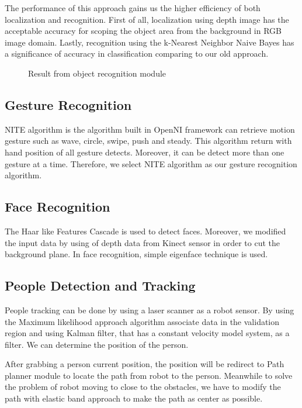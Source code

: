 \documentclass{llncs}
\begin{document}
The performance of this approach gains us the higher efficiency of both localization and recognition. First of all, localization using depth image has the acceptable accuracy for scoping the object area from the background in RGB image domain. Lastly, recognition using the  k-Nearest Neighbor Naive Bayes has a significance of accuracy in classification comparing to our old approach. 

\begin{figure}
\centering
\caption{Result from object recognition module}
\label{fig:object_recog}
\end{figure}

\subsection{Gesture Recognition}

NITE algorithm is the algorithm built in OpenNI framework can retrieve motion gesture such as wave, circle, swipe, push and steady. This algorithm return with hand position of all gesture detects.
Moreover, it can be detect more than one gesture at a time. Therefore, we select NITE algorithm as our
gesture recognition algorithm.

\subsection{Face Recognition}

The Haar like Features Cascade is used to detect faces. Moreover, we modified the input data by using of depth data from Kinect sensor in order to cut the background plane. In face recognition, simple eigenface technique is used.

\subsection{People Detection and Tracking}

People tracking can be done by using a laser scanner as a robot sensor. By using the Maximum likelihood approach algorithm associate data in the validation region and using Kalman filter, that has a constant velocity model system, as a filter. We can determine the position of the person.

After grabbing a person current position, the position will be redirect to Path planner module to locate the path from robot to the person. Meanwhile to solve the problem of robot moving to close to the obstacles, we have to modify the path with elastic band approach to make the path as center as possible.
\end{document}
